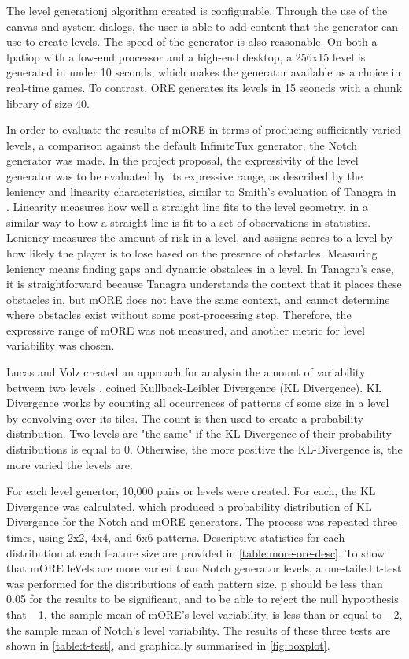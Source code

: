 The level generationj algorithm created is configurable. Through the use of the canvas
and system dialogs, the user is able to add content that the generator can use to create
levels. The speed of the generator is also reasonable. On both a lpatiop with a low-end
processor and a high-end desktop, a 256x15 level is generated in under 10 seconds, which
makes the generator available as a choice in real-time games. To contrast, ORE generates
its levels in 15 seoncds with a chunk library of size 40.

In order to evaluate the results of mORE in terms of producing sufficiently varied levels,
a comparison against the default InfiniteTux generator, the Notch generator was made. In the
project proposal, the expressivity of the level generator was to be evaluated by its 
expressive range, as described by the leniency and linearity characteristics, similar to
Smith's evaluation of Tanagra in \cite{smith2010}. Linearity measures how well a straight
line fits to the level geometry, in a similar way to how a straight line is fit to a set of
observations in statistics. Leniency measures the amount of risk in a level, and assigns
scores to a level by how likely the player is to lose based on the presence of obstacles.
Measuring leniency means finding gaps and dynamic obstalces in a level. In Tanagra's case,
it is straightforward because Tanagra understands the context that it places these
obstacles in, but mORE does not have the same context, and cannot determine where obstacles
exist without some post-processing step. Therefore, the expressive range of mORE was not
measured, and another metric for level variability was chosen.

Lucas and Volz created an approach for analysin the amount of variability between two levels
\cite{lucas2019}, coined Kullback-Leibler Divergence (KL Divergence). KL Divergence works by
counting all  occurrences of patterns of some size in a level by convolving over its tiles.
The count is then used to create a probability distribution. Two levels are "the same"
if the KL Divergence of their probability distributions is equal to 0. Otherwise, the more
positive the KL-Divergence is, the more varied the levels are.

For each level genertor, 10,000 pairs or levels were created. For each, the KL Divergence
was calculated, which produced a probability distribution of KL Divergence for the
Notch and mORE generators. The process was repeated three times, using 2x2, 4x4, and 6x6
patterns. Descriptive statistics for each distribution at each feature size are provided
in \autoref{table:more-ore-desc}. To show that mORE leVels are more varied than Notch
generator levels, a one-tailed t-test was performed for the distributions of each pattern
size. p should be less than 0.05 for the results to be significant, and to be able to
reject the null hypopthesis that \mu_1, the sample mean of mORE's level variability, is less
than or equal to \mu_2, the sample mean of Notch's level variability. The results of these
three tests are shown in \autoref{table:t-test}, and graphically summarised in 
\autoref{fig:boxplot}. 

